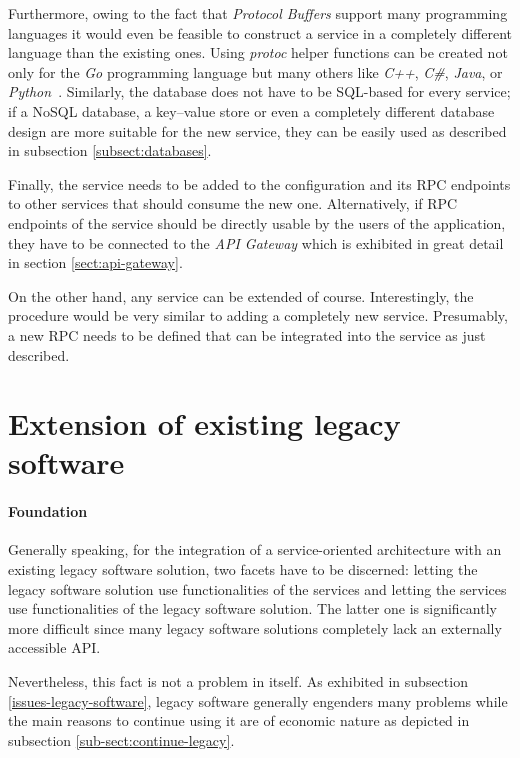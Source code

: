 \documentclass[12pt,a4paper,twoside]{report}
\begin{document}
Furthermore, owing to the fact that \textit{Protocol Buffers} support many
programming languages it would even be feasible to construct a service in a
completely different language than the existing ones.
Using \textit{protoc} helper functions can be created not only for the
\textit{Go} programming language but many others like \textit{C++}, \textit{C\#},
\textit{Java}, or \textit{Python}~\cite{protobuf}.
Similarly, the database does not have to be SQL-based for every service;
if a NoSQL database, a key–value store or even a completely different
database design are more suitable for the new service, they can be easily
used as described in subsection \ref{subsect:databases}.

Finally, the service needs to be added to the configuration and its RPC endpoints
to other services that should consume the new one.
Alternatively, if RPC endpoints of the service should be directly usable
by the users of the application, they have to be connected to the
\textit{API Gateway} which is exhibited in great detail in section \ref{sect:api-gateway}.

On the other hand, any service can be extended of course.
Interestingly, the procedure would be very similar to adding a completely new service.
Presumably, a new RPC needs to be defined that can be integrated into the service
as just described.


\section{Extension of existing legacy software}

\paragraph{Foundation}
Generally speaking, for the integration of a service-oriented architecture with
an existing legacy software solution, two facets have to be discerned:
letting the legacy software solution use functionalities of the services and
letting the services use functionalities of the legacy software solution.
The latter one is significantly more difficult since many legacy software solutions
completely lack an externally accessible API.

Nevertheless, this fact is not a problem in itself.
As exhibited in subsection \ref{issues-legacy-software}, legacy software generally
engenders many problems while the main reasons to continue using it are of
economic nature as depicted in subsection \ref{sub-sect:continue-legacy}.
\end{document}
